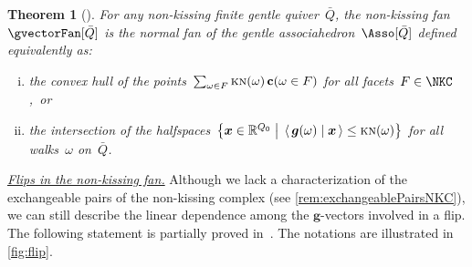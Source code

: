 \documentclass{amsart}
\newtheorem{theorem}{Theorem}[section]
\theoremstyle{definition}
\newcommand{\R}{\mathbb{R}} %
\renewcommand{\b}[1]{{\boldsymbol{#1}}} %
\newcommand{\bigset}[2]{\big\{ #1 \;\big|\; #2 \big\}} %
\newcommand{\dotprod}[2]{\left\langle \, #1 \; \middle| \; #2 \, \right\rangle} %
\newcommand{\darkblue}{\color{darkblue}} %
\newcommand{\defn}[1]{\textsl{\darkblue #1}} %
\newcommand{\para}[1]{\medskip\noindent\uline{\textit{#1.}}} %
\newcommand{\gvector}[1]{\b{g}(#1)} %
\newcommand{\cvector}[2]{\mathbf{c}(#2 \in #1)} %
\newcommand{\quiver}{\bar Q} %
\newcommand{\KN}{\textsc{kn}} %
\begin{document}
\begin{theorem}[{\cite[Thm.~4.27]{PaluPilaudPlamondon-nonkissing}}]
\label{thm:nonkissingAsso}
For any non-kissing finite gentle quiver~$\quiver$, the non-kissing fan~$\gvectorFan[\quiver]$ is the normal fan of the \defn{gentle associahedron}~$\Asso[\quiver]$ defined equivalently as:
\begin{enumerate}[(i)]
\item the convex hull of the points~$\sum_{\omega \in F} \KN(\omega) \, \cvector{F}{\omega}$ for all facets~${F \in \NKC}$,~or
\item the intersection of the halfspaces~$\bigset{\b{x} \in \R^{Q_0}}{\dotprod{\gvector{\omega}}{\b{x}} \le \KN(\omega)}$ for all walks~$\omega$ on~$\bar Q$.
\end{enumerate}
\end{theorem}

\para{Flips in the non-kissing fan}
%
\enlargethispage{-.4cm}
Although we lack a characterization of the exchangeable pairs of the non-kissing complex (see \cref{rem:exchangeablePairsNKC}), we can still describe the linear dependence among the $\b{g}$-vectors involved in a flip.
The following statement is partially proved in~\cite[Thm.~4.17]{PaluPilaudPlamondon-nonkissing}.
The notations are illustrated in \cref{fig:flip}.
\end{document}
